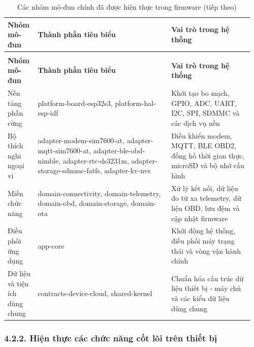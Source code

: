 \documentclass[a4paper]{extarticle}
\newcommand{\thesisterm}[1]{{\rmfamily #1}}
\newcommand{\thesissettableid}[2]{%
  \renewcommand{\thetable}{#1}%
  \renewcommand{\theHtable}{#2}%
}
\begin{document}
{\thesissettableid{4.3}{condensed-bang-4-3-cac-nhom-mo-dun-chinh-da-duoc-hien-thuc-trong-firmware}
\def\LTcaptype{table}
\begin{longtable}{|L{0.115\linewidth}|L{0.523\linewidth}|L{0.321\linewidth}|}
\caption{Các nhóm mô-đun chính đã được hiện thực trong firmware}\label{tab:condensed-bang-4-3-cac-nhom-mo-dun-chinh-da-duoc-hien-thuc-trong-firmware}\\
\hline
\textbf{Nhóm mô-đun} & \textbf{Thành phần tiêu biểu} & \textbf{Vai trò trong hệ thống} \\
\hline
\endfirsthead
\caption[]{Các nhóm mô-đun chính đã được hiện thực trong firmware (tiếp theo)}\\
\hline
\textbf{Nhóm mô-đun} & \textbf{Thành phần tiêu biểu} & \textbf{Vai trò trong hệ thống} \\
\hline
\endhead
\endfoot
\endlastfoot
Nền tảng phần cứng & \thesisterm{platform-board-esp32s3}, \thesisterm{platform-hal-esp-idf} & Khởi tạo bo mạch, GPIO, ADC, UART, I2C, SPI, SDMMC và các dịch vụ nền \\\hline
Bộ thích nghi ngoại vi & \thesisterm{adapter-modem-sim7600-at}, \thesisterm{adapter-mqtt-sim7600-at}, \thesisterm{adapter-ble-obd-nimble}, \thesisterm{adapter-rtc-ds3231m}, \thesisterm{adapter-storage-sdmmc-fatfs}, \thesisterm{adapter-kv-nvs} & Điều khiển modem, MQTT, BLE OBD2, đồng hồ thời gian thực, microSD và bộ nhớ cấu hình \\\hline
Miền chức năng & \thesisterm{domain-connectivity}, \thesisterm{domain-telemetry}, \thesisterm{domain-obd}, \thesisterm{domain-storage}, \thesisterm{domain-ota} & Xử lý kết nối, dữ liệu đo từ xa telemetry, dữ liệu OBD, lưu đệm và cập nhật firmware \\\hline
Điều phối ứng dụng & \thesisterm{app-core} & Khởi động hệ thống, điều phối máy trạng thái và vòng vận hành chính \\\hline
Dữ liệu và tiện ích dùng chung & \thesisterm{contracts-device-cloud}, \thesisterm{shared-kernel} & Chuẩn hóa cấu trúc dữ liệu thiết bị - máy chủ và các kiểu dữ liệu dùng chung \\\hline
\end{longtable}
}

\subsubsection{4.2.2. Hiện thực các chức năng cốt lõi trên thiết bị}\label{hiux1ec7n-thux1ef1c-cuxe1c-chux1ee9c-nux103ng-cux1ed1t-luxf5i-truxean-thiux1ebft-bux1ecb}
\end{document}
